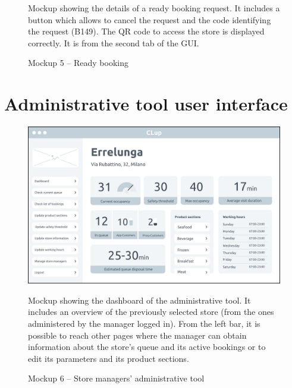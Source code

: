 \documentclass[a4paper,oneside,11pt]{book}
\newcommand{\captiondd}[2]{\caption{#1}\par\begin{center}\vspace{-.01\textheight}\small#2.\end{center}}
\begin{document}
\begin{multicols}{2}
\begin{figure}[H]
            \captiondd{Mockup 5 -- Ready booking}{Mockup showing the details of a ready booking request. It includes a button which allows to cancel the request and the code identifying the request (B149). The QR code to access the store is displayed correctly. It is from the second tab of the GUI}
            \label{figure:mockup_5}
        \end{figure}
    \end{multicols}
    \newpage
    \section{Administrative tool user interface}
    \begin{figure}[H]
            \centering
            \includegraphics[width=\textwidth, keepaspectratio]{pictures/mockups/manager_view}
            \captiondd{Mockup 6 -- Store managers' administrative tool}{Mockup showing the dashboard of the administrative tool. It includes an overview of the previously selected store (from the ones administered by the manager logged in). From the left bar, it is possible to reach other pages where the manager can obtain information about the store’s queue and its active bookings or to edit its parameters and its product sections}
            \label{figure:mockup_6}
        \end{figure}
    
\end{document}
